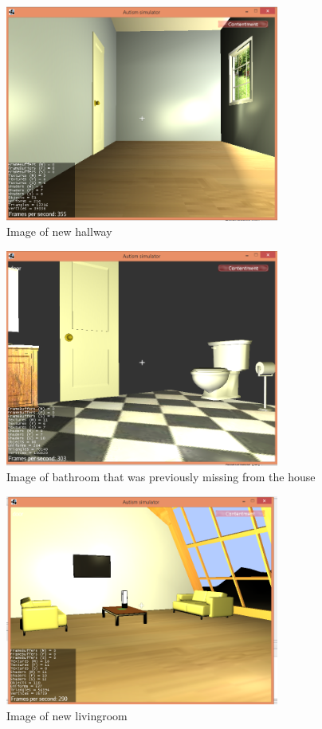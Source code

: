 \documentclass[11pt]{report}
\begin{document}
\begin{figure}[H]
\centering
\includegraphics[width=90mm]{images/new_hallway2.png}
\caption{Image of new hallway}
\label{newhallway2}
\end{figure}

\begin{figure}[H]
\centering
\includegraphics[width=90mm]{images/new_bathroom.png}
\caption{Image of bathroom that was previously missing from the house}
\label{old_house}
\end{figure}

\begin{figure}[H]
\centering
\includegraphics[width=90mm]{images/new_livingroom.png}
\caption{Image of new livingroom}
\label{old_house}
\end{figure}
\end{document}
